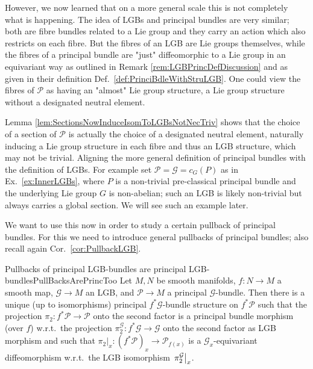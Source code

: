 \documentclass[a4paper,oneside,11pt,bibliography=totoc]{scrartcl}
\theoremstyle{plain}
\theoremstyle{remark}
\theoremstyle{definition}
\begin{document}
However, we now learned that on a more general scale this is not completely what is happening. The idea of LGBs and principal bundles are very similar; both are fibre bundles related to a Lie group and they carry an action which also restricts on each fibre. But the fibres of an LGB are Lie groups themselves, while the fibres of a principal bundle are "just" diffeomorphic to a Lie group in an equivariant way as outlined in Remark \ref{rem:LGBPrincDefDiscussion} and as given in their definition Def.\ \ref{def:PrinciBdleWithStruLGB}. One could view the fibres of $\mathcal{P}$ as having an "almost" Lie group structure, a Lie group structure without a designated neutral element. 

Lemma \ref{lem:SectionsNowInduceIsomToLGBsNotNecTriv} shows that the choice of a section of $\mathcal{P}$ is actually the choice of a designated neutral element, naturally inducing a Lie group structure in each fibre and thus an LGB structure, which may not be trivial. Aligning the more general definition of principal bundles with the definition of LGBs. For example set $\mathcal{P} = \mathcal{G} = c_G(P)$ as in Ex.\ \ref{ex:InnerLGBs}, where $P$ is a non-trivial pre-classical principal bundle and the underlying Lie group $G$ is non-abelian; such an LGB is likely non-trivial but always carries a global section. We will see such an example later.

We want to use this now in order to study a certain pullback of principal bundles. For this we need to introduce general pullbacks of principal bundles; also recall again Cor.\ \ref{cor:PullbackLGB}.

\begin{corollaries}{Pullbacks of principal LGB-bundles are principal LGB-bundles}{PullBacksArePrincToo}
Let $M, N$ be smooth manifolds, $f: N \to M$ a smooth map, $\mathcal{G} \to M$ an LGB, and $\mathcal{P} \to M$ a principal $\mathcal{G}$-bundle. Then there is a unique (up to isomorphisms) principal $f^*\mathcal{G}$-bundle structure on $f^*\mathcal{P}$ such that the projection $\pi_2: f^*\mathcal{P} \to \mathcal{P}$ onto the second factor is a principal bundle morphism (over $f$) w.r.t.\ the projection $\pi_2^{\mathcal{G}}: f^*\mathcal{G} \to \mathcal{G}$ onto the second factor as LGB morphism and such that $\pi_2|_x: (f^*\mathcal{P})_x \to \mathcal{P}_{f(x)}$ is a $\mathcal{G}_x$-equivariant diffeomorphism w.r.t.\ the LGB isomorphism $\mleft.\pi_2^{\mathcal{G}}\mright|_x$.
%
\end{corollaries}
\end{document}
